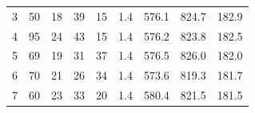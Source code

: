 \begin{table}[ht!]
\begin{tabular}{ccccccccc}
		\multicolumn{1}{c|}{3}               & 50                                                           & 18                                                                & 39                                                               & \multicolumn{1}{c|}{15}                                                               & 1.4                                                           & 576.1                                                              & 824.7                                                             & 182.9                                                             \\
		\multicolumn{1}{c|}{4}               & 95                                                           & 24                                                                & 43                                                               & \multicolumn{1}{c|}{15}                                                               & 1.4                                                           & 576.2                                                              & 823.8                                                             & 182.5                                                             \\
		\multicolumn{1}{c|}{5}               & 69                                                           & 19                                                                & 31                                                               & \multicolumn{1}{c|}{37}                                                               & 1.4                                                           & 576.5                                                              & 826.0                                                             & 182.0                                                             \\
		\multicolumn{1}{c|}{6}               & 70                                                           & 21                                                                & 26                                                               & \multicolumn{1}{c|}{34}                                                               & 1.4                                                           & 573.6                                                              & 819.3                                                             & 181.7                                                             \\
		\multicolumn{1}{c|}{7}               & 60                                                           & 23                                                                & 33                                                               & \multicolumn{1}{c|}{20}                                                               & 1.4                                                           & 580.4                                                              & 821.5                                                             & 181.5                                                             \\

\end{tabular}
\end{table}
